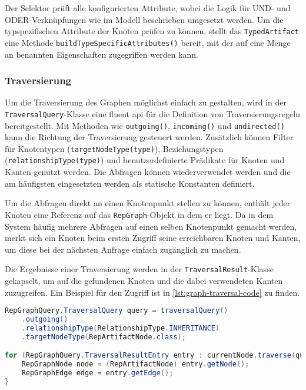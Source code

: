 Der Selektor prüft alle konfigurierten Attribute, wobei die Logik für UND- und ODER-Verknüpfungen wie im Modell beschrieben umgesetzt werden.
Um die typspezifischen Attribute der Knoten prüfen zu können, stellt das \texttt{TypedArtifact} eine Methode \texttt{buildTypeSpecificAttributes()} bereit, mit der auf eine Menge an benannten Eigenschaften zugegriffen werden kann.

\subsubsection{Traversierung}

Um die Traversierung des Graphen möglichst einfach zu gestalten, wird in der \texttt{TraversalQuery}-Klasse eine fluent \acrshort{api} für die Definition von Traversierungsregeln bereitgestellt.
Mit Methoden wie \texttt{outgoing()}, \texttt{incoming()} und \texttt{undirected()} kann die Richtung der Traversierung gesteuert werden.
Zusätzlich können Filter für Knotentypen (\texttt{targetNodeType(type)}), Beziehungstypen (\texttt{relationshipType(type)}) und benutzerdefinierte Prädikate für Knoten und Kanten genutzt werden.
Die Abfragen können wiederverwendet werden und die am häufigsten eingesetzten werden als statische Konstanten definiert.

Um die Abfragen direkt an einen Knotenpunkt stellen zu können, enthält jeder Knoten eine Referenz auf das \texttt{RepGraph}-Objekt in dem er liegt.
Da in dem System häufig mehrere Abfragen auf einen selben Knotenpunkt gemacht werden, merkt sich ein Knoten beim ersten Zugriff seine erreichbaren Knoten und Kanten, um diese bei der nächsten Anfrage einfach zugänglich zu machen.

Die Ergebnisse einer Traversierung werden in der \texttt{TraversalResult}-Klasse gekapselt, um auf die gefundenen Knoten und die dabei verwendeten Kanten zuzugreifen.
Ein Beispiel für den Zugriff ist in \autoref{lst:graph-traversal-code} zu finden.

\begin{lstlisting}[language=Java,caption={Traversierungsabfragen in Java},label=lst:graph-traversal-code,basicstyle=\ttfamily\scriptsize]
RepGraphQuery.TraversalQuery query = traversalQuery()
    .outgoing()
    .relationshipType(RelationshipType.INHERITANCE)
    .targetNodeType(RepArtifactNode.class);

for (RepGraphQuery.TraversalResultEntry entry : currentNode.traverse(query)) {
    RepGraphNode node = (RepArtifactNode) entry.getNode();
    RepGraphEdge edge = entry.getEdge();
}
\end{lstlisting}

